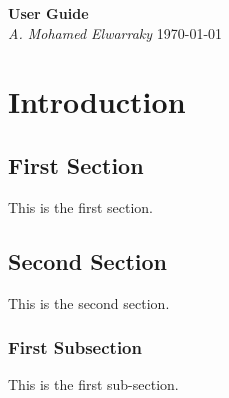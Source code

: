 \documentclass[12pt, letterpaper]{report}
\begin{document}
\begin{titlepage}
    \begin{center}
       \Large\textbf{User Guide}\\
       \large\textit{A. Mohamed Elwarraky}
       \large\today
    \end{center}
\end{titlepage}

\newpage

\chapter{Introduction}

\section{First Section}

This is the first section.

\section{Second Section}

This is the second section.

\subsection{First Subsection}

This is the first sub-section.
\end{document}
